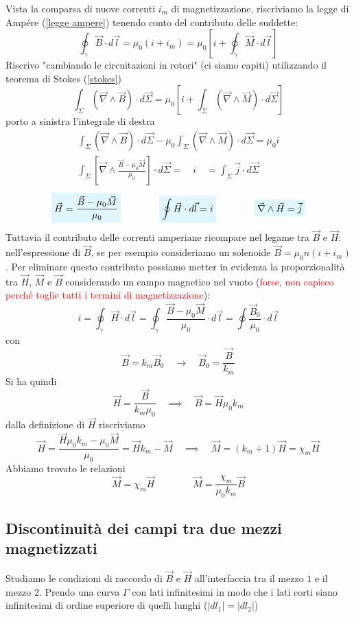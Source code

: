 \documentclass[x11names]{report}
\newcommand{\viola}[1]{%
	\colorbox{myblue}{$\displaystyle #1$}
}
\begin{document}
Vista la comparsa di nuove correnti \(i_m\) di magnetizzazione, riscriviamo la legge di Ampére (\ref{legge ampere}) tenendo conto del contributo delle suddette:
\[
\oint_\gamma \vec{B}\cdot d\vec{l} = \mu_0(i+i_m) = \mu_0\left[i + \oint_\gamma \vec{M}\cdot d\vec{l}\right]
\]
Riscrivo "cambiando le circuitazioni in rotori" (ci siamo capiti) utilizzando il teorema di Stokes (\ref{stokes}) 
\[
\int_\Sigma \left(\vec{\nabla}\wedge\vec{B}\right)\cdot d\vec{\Sigma}  =  \mu_0\left[i + \int_\Sigma\left(\vec{\nabla}\wedge\vec{M}\right)\cdot d\vec{\Sigma}\right]
\]
porto a sinistra l'integrale di destra 
\begin{gather*}
	\int_\Sigma \left(\vec{\nabla}\wedge\vec{B}\right)\cdot d\vec{\Sigma} - \mu_0\int_\Sigma\left(\vec{\nabla}\wedge\vec{M}\right)\cdot d\vec{\Sigma} = \mu_0 i \\
	\int_\Sigma \left[\vec{\nabla}\wedge \frac{\vec{B}-\mu_0\vec{M}}{\mu_0}\right] \cdot d\vec{\Sigma} = \quad i \quad = \int_\Sigma \vec{j} \cdot d\vec{\Sigma}
\end{gather*}
\begin{equation}
		\viola{\vec{H} = \frac{\vec{B}-\mu_0\vec{M}}{\mu_0}} \qquad \qquad \viola{\oint \vec{H} \cdot d\vec{l} = i} \qquad \qquad \viola{\vec{\nabla} \wedge \vec{H} = \vec{j}}
\end{equation}
Tuttavia il contributo delle correnti amperiane ricompare nel legame tra \(\vec{B}\) e \(\vec{H}\): nell'espressione di \(\vec{B}\), se per esempio consideriamo un solenoide \(\vec{B} = \mu_0n(i + i_m)\). Per eliminare questo contributo possiamo metter in evidenza la proporzionalità tra \(\vec{H}\), \(\vec{M}\) e \(\vec{B}\) considerando un campo magnetico nel vuoto (\textcolor{red}{forse, non capisco perché toglie tutti i termini di magnetizzazione}):
\[
i = \oint_\gamma \vec{H} \cdot d\vec{l} = \oint_\gamma \frac{\vec{B} - \mu_0 \vec{M}}{\mu_0} \cdot d\vec{l} = \oint \frac{\vec{B}_0}{\mu_0} \cdot d\vec{l}
\]
con 
\[
\vec{B} = k_m\vec{B}_0  \quad \to \quad \vec{B}_0 = \frac{\vec{B}}{k_m}
\]
Si ha quindi
\[
\vec{H} = \frac{\vec{B}}{k_m\mu_0} \quad \implies \quad \boxed{\vec{B} = \vec{H}\mu_0 k_m}
\]
dalla definizione di \(\vec{H}\) riscriviamo
\[
\vec{H} = \frac{\vec{H}\mu_0 k_m - \mu_0 \vec{M}}{\mu_0} = \vec{H} k_m - \vec{M} \quad \implies \quad \vec{M} = (k_m + 1)\vec{H} = \chi_m \vec{H}
\]
Abbiamo trovato le relazioni
\[
\boxed{\vec{M} = \chi_m \vec{H}} \qquad \qquad\boxed{\vec{M} = \frac{\chi_m}{\mu_0 k_m}\vec{B}}
\]

\subsection{Discontinuità dei campi tra due mezzi magnetizzati}
Studiamo le condizioni di raccordo di \(\vec{B}\) e \(\vec{H}\) all'interfaccia tra il mezzo \(1\) e il mezzo \(2\). Prendo una curva \(\Gamma\) con lati infinitesimi in modo che i lati corti siano infinitesimi di ordine superiore di quelli lunghi (\(|dl_1| = |dl_2|\))
\end{document}
